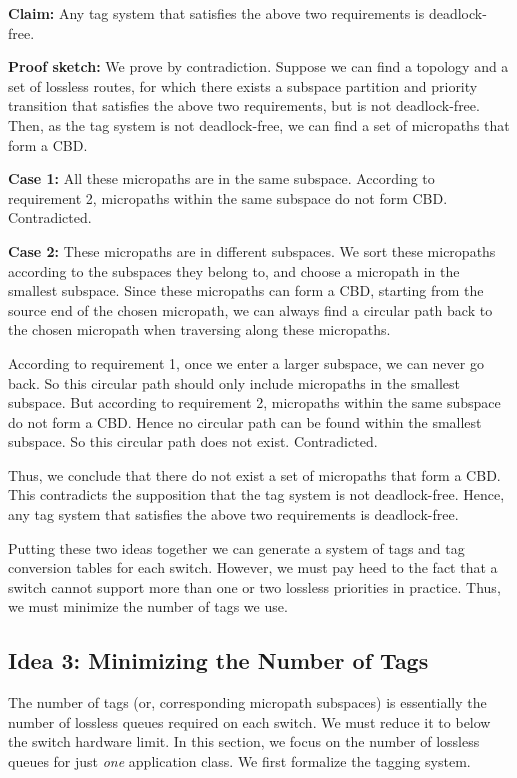 
\textbf{Claim:} Any tag system that satisfies the above two requirements is deadlock-free.

\textbf{Proof sketch:} We prove by contradiction. Suppose we can find a topology and a
set of lossless routes, for which there exists a subspace partition and priority
transition that satisfies the above two requirements, but is not deadlock-free.
Then, as the tag system is not deadlock-free, we can find a set of micropaths
that form a CBD. 

\textbf{Case 1:} All these micropaths are in the same subspace. According to
requirement 2, micropaths within the same subspace do not form CBD.
Contradicted.

\textbf{Case 2:} These micropaths are in different subspaces. We sort these
micropaths according to the subspaces they belong to, and choose a micropath in
the smallest subspace. Since these micropaths can form a CBD,  starting from the
source end of the chosen micropath, we can always find a circular path back to
the chosen micropath when traversing along these micropaths. 
 
According to requirement 1, once we enter a larger subspace, we can never go
back. So this circular path should only include micropaths in the smallest
subspace. But according to requirement 2, micropaths within the same subspace do
not form a CBD. Hence no circular path can be found within the smallest
subspace. So this circular path does not exist. Contradicted.
 
Thus, we conclude that there do not exist a set of micropaths that form a CBD.
This contradicts the supposition that the tag system is not deadlock-free.
Hence, any tag system that satisfies the above two requirements is
deadlock-free.

Putting these two ideas together we can generate a system of tags and tag
conversion tables for each switch. However, we must pay heed to the fact that 
a switch cannot support more than one or two lossless priorities in practice. 
Thus, we must minimize the number of tags we use.

\subsection{Idea 3: Minimizing the Number of Tags} The number of tags (or,
corresponding micropath subspaces) is essentially the number of lossless queues
required on each switch.  We must reduce it to below the switch hardware limit.
In this section, we focus on the number of lossless queues for just {\em one}
application class. We first formalize the tagging system.

